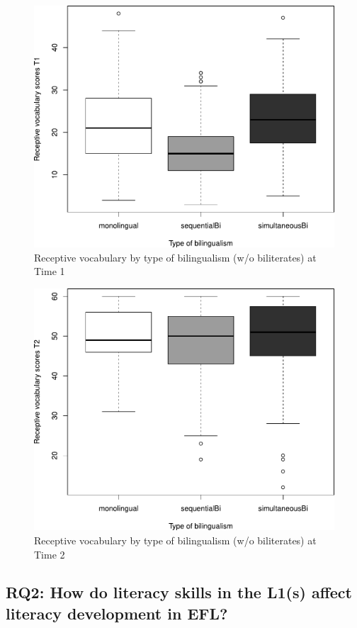 \documentclass[output=paper,modfonts,nonflat,newtxmath]{langsci/langscibook}
\begin{document}
\begin{figure} %
\includegraphics[width=.75\textwidth]{figures/PfenningerFigure5.pdf}
\caption{\label{fig:pfenninger:5}Receptive vocabulary by type of bilingualism (w/o biliterates) at Time 1}
\end{figure}

\begin{figure} %
\includegraphics[width=.75\textwidth]{figures/PfenningerFigure6.pdf}
\caption{\label{fig:pfenninger:6} Receptive vocabulary by type of bilingualism (w/o biliterates) at Time 2}
\end{figure}

\subsection{RQ2: {How} {do} {literacy} {skills} {in} {the} {L1(s)} {affect} {literacy} {development} {in} {EFL?}}

\end{document}
